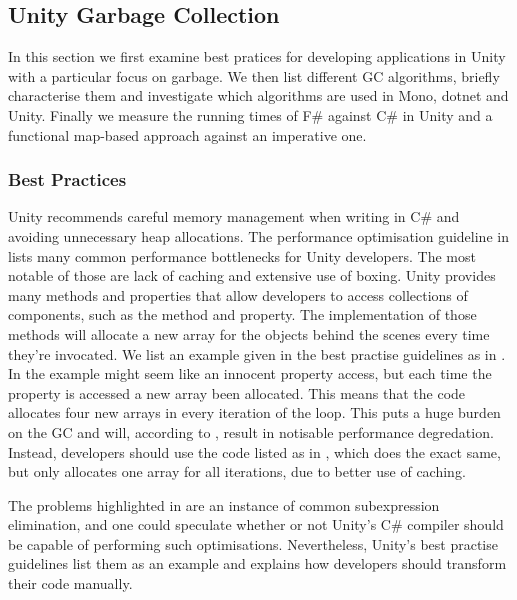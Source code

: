 \subsection{Unity Garbage Collection}
In this section we first examine best pratices for developing applications in Unity with a particular focus on garbage. We then list different \gls{GC} algorithms, briefly characterise them and investigate which algorithms are used in Mono, dotnet and Unity. Finally we measure the running times of F\# against C\# in Unity and a functional map-based approach against an imperative one.

\subsubsection{Best Practices}
Unity recommends careful memory management when writing in C\# and avoiding unnecessary heap allocations\cite{unity:optimisation}. The performance optimisation guideline in \cite{unity:optimisation} lists many common performance bottlenecks for Unity developers. The most notable of those are lack of caching and extensive use of boxing. Unity provides many methods and properties that allow developers to access collections of components, such as the  method and  property\cite{unity:optimisation, unity:heap}. The implementation of those methods will allocate a new array for the objects behind the scenes every time they're invocated. We list an example given in the best practise guidelines as  in \cite{unity:heap}. In the example  might seem like an innocent property access, but each time the property is accessed a new array been allocated. This means that the code allocates four new arrays in every iteration of the loop. This puts a huge burden on the \gls{GC} and will, according to \cite{unity:heap}, result in notisable performance degredation. Instead, developers should use the code listed as  in , which does the exact same, but only allocates one array for all iterations, due to better use of caching.

The problems highlighted in  are an instance of common subexpression elimination, and one could speculate whether or not Unity's C\# compiler should be capable of performing such optimisations. Nevertheless, Unity's best practise guidelines list them as an example and explains how developers should transform their code manually\cite{unity:heap}.

